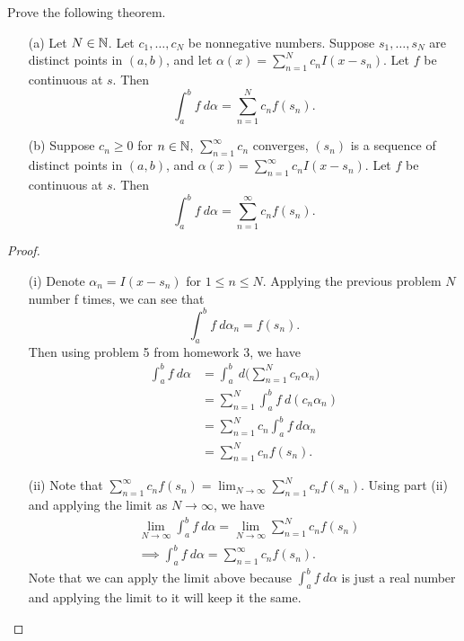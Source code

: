 \documentclass[a4paper]{article}
\begin{document}
\begin{problem}
    Prove the following theorem.
\end{problem}
\begin{theorem}
    \begin{enumerate}
        \item[(a)] Let \( N \in \mathbb{N} \). Let \( {c}_{1}, \dots, {c}_{N} \) be nonnegative numbers. Suppose \( {s}_{1}, \dots, {s}_{N} \) are distinct points in \( (a,b) \), and let \( \alpha(x) = \sum_{ n=1  }^{ N } {c}_{n} I(x - {s}_{n}) \). Let \( f  \) be continuous at \( s  \). Then
            \[  \int_{ a }^{ b } f \ d \alpha = \sum_{ n=1  }^{ N  } {c}_{n} f({s}_{n}).  \] \item[(b)] Suppose \( {c}_{n} \geq 0  \) for \( n \in \mathbb{N} \), \( \sum_{ n=1  }^{ \infty  } {c}_{n} \) converges, \( ({s}_{n}) \) is a sequence of distinct points in \( (a,b) \), and \( \alpha(x) = \sum_{ n=1  }^{ \infty  } {c}_{n} I (x - {s}_{n}) \). Let \( f \) be continuous at \( s  \). Then
            \[  \int_{ a }^{ b } f  \ d \alpha = \sum_{ n=1  }^{ \infty  } {c}_{n} f({s}_{n}). \]
    \end{enumerate}
\end{theorem}
\begin{proof}
    \begin{enumerate}
        \item[(i)] Denote \( {\alpha}_{n} = I(x - {s}_{n}) \) for \( 1 \leq n \leq N  \). Applying the previous problem \( N \) number f times, we can see that 
\[  \int_{ a }^{ b } f  \ d \alpha_n = f({s}_{n}).   \]
    Then using problem 5 from homework 3, we have
    \begin{align*}
        \int_{ a }^{ b } f \ d \alpha &= \int_{ a }^{ b }  \ d \Big(  \sum_{ n=1  }^{ N } {c}_{n} {\alpha}_{n} \Big) \\
                                      &= \sum_{ n=1  }^{ N } \int_{ a }^{ b } f  \ d ({c}_{n} {\alpha}_{n}) \\
                                      &= \sum_{ n=1 }^{ N } {c}_{n} \int_{ a }^{ b } f   \ d {\alpha}_{n} \\
                                      &= \sum_{ n=1  }^{ N  } {c}_{n} f({s}_{n}).
    \end{align*}
\item[(ii)] Note that \( \sum_{ n=1  }^{ \infty  } {c}_{n} f({s}_{n}) = \lim_{ N \to \infty  }  \sum_{ n=1  }^{ N  } {c}_{n} f({s}_{n}) \). Using part (ii) and applying the limit as \( N \to \infty  \), we have 
    \begin{align*}
    &\lim_{ N \to \infty  }  \int_{ a }^{ b } f  \ d \alpha = \lim_{ N \to \infty  } \sum_{ n=1 }^{  N  } {c}_{n} f({s}_{n}) \\
    &\implies \int_{ a }^{ b } f  \ d \alpha = \sum_{ n=1  }^{ \infty  }{c}_{n} f({s}_{n}).
    \end{align*}
    Note that we can apply the limit above because \( \int_{ a }^{ b } f  \ d \alpha \) is just a real number and applying the limit to it will keep it the same.
    \end{enumerate}
    
\end{proof}
\end{document}
